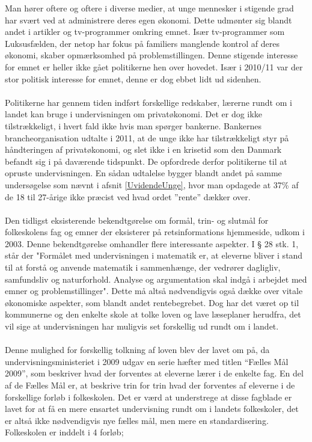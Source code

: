 \label{okonomipaaskemaet}

Man hører oftere og oftere i diverse medier, at unge mennesker i stigende grad har svært ved at administrere deres egen økonomi. Dette udmønter sig blandt andet i artikler og tv-programmer omkring emnet. Især tv-programmer som Luksusfælden, der netop har fokus på familiers manglende kontrol af deres økonomi, skaber opmærksomhed på problemstillingen. Denne stigende interesse for emnet er heller ikke gået politikerne hen over hovedet. Især i 2010/11 var der stor politisk interesse for emnet, denne er dog ebbet lidt ud sidenhen.\\
\\
Politikerne har gennem tiden indført forskellige redskaber, lærerne rundt om i landet kan bruge i undervisningen om privatøkonomi. Det er dog ikke tilstrækkeligt, i hvert fald ikke hvis man spørger bankerne. Bankernes brancheorganisation udtalte i 2011, at de unge ikke har tilstrækkeligt styr på håndteringen af privatøkonomi, og slet ikke i en krisetid som den Danmark befandt sig i på daværende tidspunkt. De opfordrede derfor politikerne til at opruste undervisningen. En sådan udtalelse bygger blandt andet på samme undersøgelse som nævnt i afsnit \ref{UvidendeUnge}, hvor man opdagede at 37\% af de 18 til 27-årige ikke præcist ved hvad ordet ”rente” dækker over.\\ %
\\
Den tidligst eksisterende bekendtgørelse om formål, trin- og slutmål for folkeskolens fag og emner der eksisterer på retsinformations hjemmeside, udkom i 2003. Denne bekendtgørelse omhandler flere interessante aspekter. I § 28 stk. 1, står der "Formålet med undervisningen i matematik er, at eleverne bliver i stand til at forstå og anvende matematik i sammenhænge, der vedrører dagligliv, samfundsliv og naturforhold. Analyse og argumentation skal indgå i arbejdet med emner og problemstillinger". Dette må altså nødvendigvis også dække over vitale økonomiske aspekter, som blandt andet rentebegrebet. Dog har det været op til kommunerne og den enkelte skole at tolke loven og lave læseplaner herudfra, det vil sige at undervisningen har muligvis set forskellig ud rundt om i landet.\cite{Bekendtgorelse}\\
\\
Denne mulighed for forskellig tolkning af loven blev der lavet om på, da undervisningsministeriet i 2009 udgav en serie hæfter med titlen “Fælles Mål 2009”, som beskriver hvad der forventes at eleverne lærer i de enkelte fag. En del af de Fælles Mål er, at beskrive trin for trin hvad der forventes af eleverne i de forskellige forløb i folkeskolen. Det er værd at understrege at disse fagblade er lavet for at få en mere ensartet undervisning rundt om i landets folkeskoler, det er altså ikke nødvendigvis nye fælles mål, men mere en standardisering. 
Folkeskolen er inddelt i 4 forløb;

